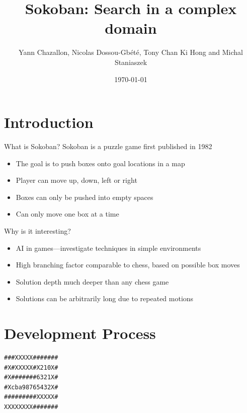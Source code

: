 \documentclass{beamer}
\title[Sokoban] %
{Sokoban: Search in a complex domain}
\author[Chazallon, Dossou-Gb{\'e}t{\'e}, Hong, Staniaszek]{Yann Chazallon,  Nicolas Dossou-Gb{\'e}t{\'e}, Tony Chan Ki Hong and Michal Staniaszek}
\date{\today}
\begin{document}
\begin{frame}
  \titlepage
\end{frame}

\section{Introduction}

\begin{frame}{What is Sokoban?}
  Sokoban is a puzzle game first published in 1982
  \begin{itemize}
    \item The goal is to push boxes onto goal locations in a map
    \item Player can move up, down, left or right
    \item Boxes can only be pushed into empty spaces
    \item Can only move one box at a time
  \end{itemize}
\end{frame} 

\begin{frame}{Why is it interesting?}
  \begin{itemize}
  \item AI in games---investigate techniques in simple environments
  \item High branching factor comparable to chess, based on possible box moves
  \item Solution depth much deeper than any chess game
  \item Solutions can be arbitrarily long due to repeated motions
  \end{itemize}
\end{frame}

\section{Development Process}


\begin{lrbox}{\mapstatic}
  \begin{minipage}{.25\textwidth}
\centering
\begin{BVerbatim}
###XXXXX#######
#X#XXXXX#X210X#
#X#######6321X#
#Xcba98765432X#
#########XXXXX#
XXXXXXXX#######
\end{BVerbatim}
  \end{minipage}
\end{lrbox}%
\end{document}
